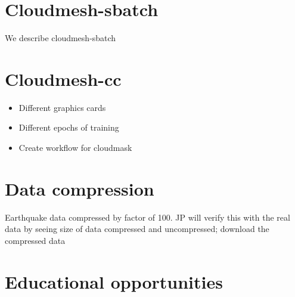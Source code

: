 \documentclass[utf8]{FrontiersinVancouver} %
\begin{document}
\section{Cloudmesh-sbatch}

We describe cloudmesh-sbatch

\section{Cloudmesh-cc}

\begin{itemize}
\item Different graphics cards

\item Different epochs of training

\item Create workflow for cloudmask
\end{itemize}

\section{Data compression}

Earthquake data compressed by factor of 100. JP will verify
this with the real data by seeing size of data compressed and
uncompressed; download the compressed data

\section{Educational opportunities}
\end{document}
